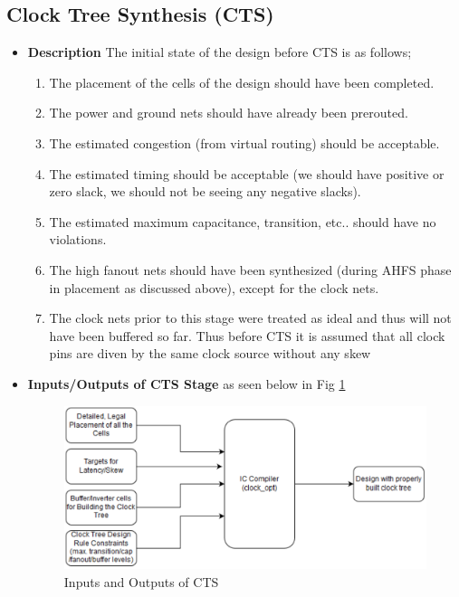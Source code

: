 \documentclass[../main.tex]{subfiles}
\begin{document}
    \subsection{Clock Tree Synthesis (CTS)}
     \begin{itemize}
\item \textbf{Description} The initial state of the design before CTS is as follows; 

\begin{enumerate}
\item The placement of the cells of the design should have been completed. 
\item  The power and ground nets should have already been prerouted. 
\item The estimated congestion (from virtual routing) should be acceptable. 
\item The estimated timing should be acceptable (we should have positive or zero slack, we should not be seeing any negative slacks). 
\item The estimated maximum capacitance, transition, etc.. should have no violations. 
\item The high fanout nets should have been synthesized (during AHFS phase in placement as 
discussed above), except for the clock nets. 
\item  The clock nets prior to this stage were treated as ideal and thus will not have been buffered 
so far. Thus before CTS it is assumed that all clock pins are diven by the same clock source 
without any skew

\end{enumerate}
\item \textbf{Inputs/Outputs of CTS Stage} as seen below in Fig \ref{fig:IO_CTS}

\begin{figure}[h]
\centering
\includegraphics[width=17cm]{diagrams/IO_CTS.PNG}
\caption{ Inputs and Outputs of CTS}
\label{fig:IO_CTS}
\end{figure}



\end{itemize}
\end{document}
